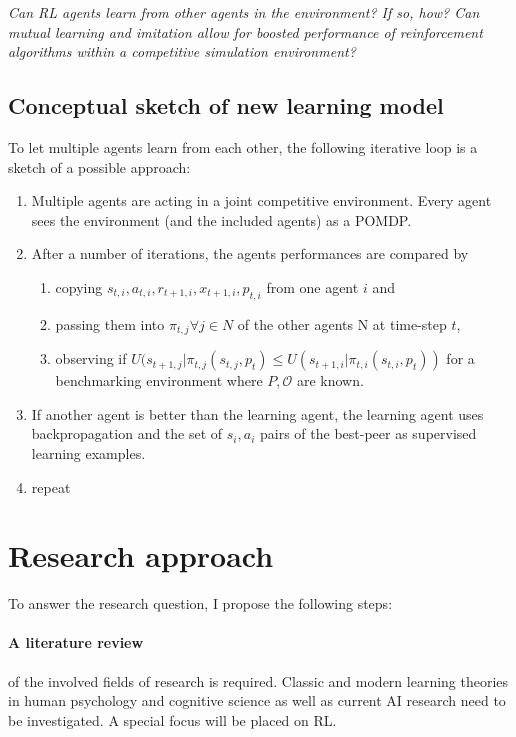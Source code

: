 \documentclass[12pt,a4paper]{article}
\begin{document}
\emph{Can \ac{RL} agents learn from other agents in the environment? If so, how? Can mutual learning and imitation allow
for boosted performance of reinforcement algorithms within a competitive simulation environment?}

\subsection{Conceptual sketch of new learning model}

To let multiple agents learn from each other, the following iterative loop is a sketch of a possible approach:



\begin{enumerate} \item Multiple agents are acting in a joint competitive environment. Every agent sees the environment
    (and the included agents) as a \ac{POMDP}.  \item After a number of iterations, the agents performances are compared
    by

\begin{enumerate} \item copying
    $s_{t,i},a_{t,i},r_{t+1,i},x_{t+1,i},p_{t,i}$ from one agent $i$ and \item passing them into $\pi_{t,j} \forall j
    \in N $ of the other agents N at time-step $t$, \item  observing if $ U(s_{t+1,j} \vert \pi_{t,j}(s_{t,j}, p_t) \leq
    U(s_{t+1,i} \vert \pi_{t,i}(s_{t,i},p_t))$ for a benchmarking environment where $P, \mathcal{O}$ are known.
    \end{enumerate} \item  If another agent is better than the learning agent, the learning agent uses backpropagation
    and the set of $s_i,a_i$ pairs of the best-peer as supervised learning examples.  \item repeat \end{enumerate}

\section{Research approach}


To answer the research question, I propose the following steps:

\paragraph{A literature review} of the involved fields of research is required. Classic and modern learning theories in
human psychology and cognitive science as well as current AI research need to be investigated. A special focus will be
placed on \ac{RL}.
\end{document}
